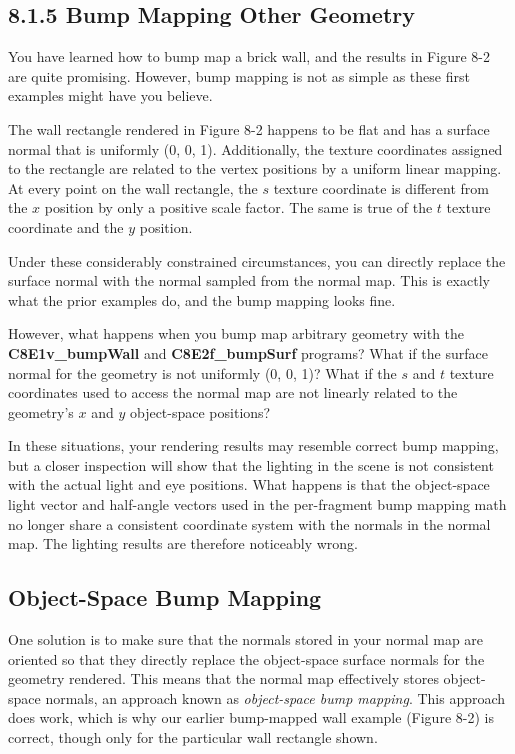 \documentclass[../main.tex]{subfiles}
\begin{document}
\subsection{8.1.5 Bump Mapping Other Geometry}

You have learned how to bump map a brick wall, and the results in Figure 8-2 are quite promising. However, bump mapping is not as simple as these first examples might have you believe.

The wall rectangle rendered in Figure 8-2 happens to be flat and has a surface normal that is uniformly (0, 0, 1). Additionally, the texture coordinates assigned to the rectangle are related to the vertex positions by a uniform linear mapping. At every point on the wall rectangle, the $s$ texture coordinate is different from the $x$ position by only a positive scale factor. The same is true of the $t$ texture coordinate and the $y$ position.

Under these considerably constrained circumstances, you can directly replace the surface normal with the normal sampled from the normal map. This is exactly what the prior examples do, and the bump mapping looks fine.

However, what happens when you bump map arbitrary geometry with the \textbf{C8E1v_bumpWall} and \textbf{C8E2f_bumpSurf} programs? What if the surface normal for the geometry is not uniformly (0, 0, 1)? What if the $s$ and $t$ texture coordinates used to access the normal map are not linearly related to the geometry's $x$ and $y$ object-space positions?

In these situations, your rendering results may resemble correct bump mapping, but a closer inspection will show that the lighting in the scene is not consistent with the actual light and eye positions. What happens is that the object-space light vector and half-angle vectors used in the per-fragment bump mapping math no longer share a consistent coordinate system with the normals in the normal map. The lighting results are therefore noticeably wrong.

\subsection*{Object-Space Bump Mapping}

One solution is to make sure that the normals stored in your normal map are oriented so that they directly replace the object-space surface normals for the geometry rendered. This means that the normal map effectively stores object-space normals, an approach known as \textit{object-space bump mapping}. This approach does work, which is why our earlier bump-mapped wall example (Figure 8-2) is correct, though only for the particular wall rectangle shown.
\end{document}
